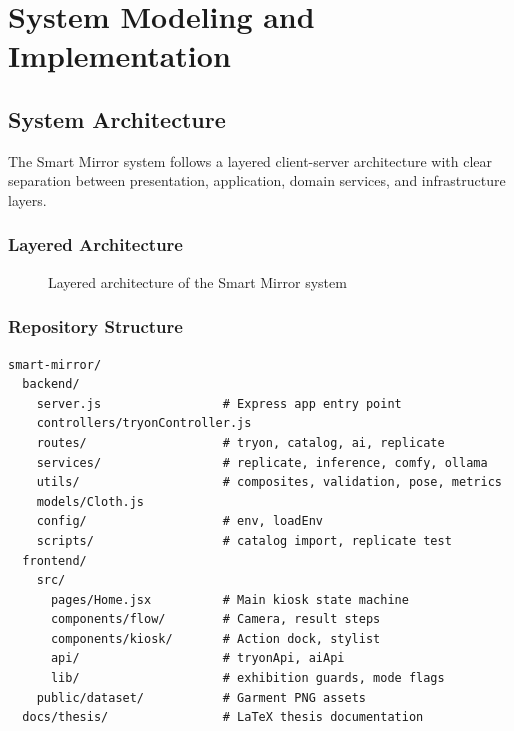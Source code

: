 \chapter{System Modeling and Implementation}
\label{ch:system-modeling}

\section{System Architecture}
\label{sec:architecture}

The Smart Mirror system follows a layered client-server architecture with clear separation between presentation, application, domain services, and infrastructure layers.

\subsection{Layered Architecture}

\begin{figure}[H]
  \centering
  \caption{Layered architecture of the Smart Mirror system}
  \label{fig:layered-architecture}
\end{figure}

\subsection{Repository Structure}

\begin{lstlisting}[language={}, caption={Project directory structure}, label={lst:repo-structure}]
smart-mirror/
  backend/
    server.js                 # Express app entry point
    controllers/tryonController.js
    routes/                   # tryon, catalog, ai, replicate
    services/                 # replicate, inference, comfy, ollama
    utils/                    # composites, validation, pose, metrics
    models/Cloth.js
    config/                   # env, loadEnv
    scripts/                  # catalog import, replicate test
  frontend/
    src/
      pages/Home.jsx          # Main kiosk state machine
      components/flow/        # Camera, result steps
      components/kiosk/       # Action dock, stylist
      api/                    # tryonApi, aiApi
      lib/                    # exhibition guards, mode flags
    public/dataset/           # Garment PNG assets
  docs/thesis/                # LaTeX thesis documentation
\end{lstlisting}

